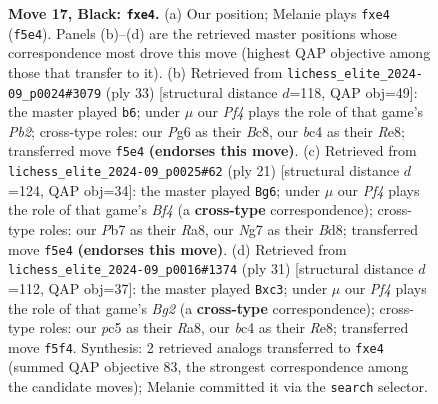 \documentclass[11pt]{article}
\begin{document}
\begin{figure}[p]
\caption{\textbf{Move 17, Black: \texttt{fxe4}.} (a) Our position; Melanie plays \texttt{fxe4} (\texttt{f5e4}). Panels (b)--(d) are the retrieved master positions whose correspondence most drove this move (highest QAP objective among those that transfer to it). (b) Retrieved from \texttt{lichess\_elite\_2024-09\_p0024\#3079} (ply 33) [structural distance $d$=118, QAP obj=49]: the master played \texttt{b6}; under $\mu$ our \emph{Pf4} plays the role of that game's \emph{Pb2}; cross-type roles: our \emph{P}g6 as their \emph{B}c8, our \emph{b}c4 as their \emph{R}e8; transferred move \texttt{f5e4} \textbf{(endorses this move)}. (c) Retrieved from \texttt{lichess\_elite\_2024-09\_p0025\#62} (ply 21) [structural distance $d$=124, QAP obj=34]: the master played \texttt{Bg6}; under $\mu$ our \emph{Pf4} plays the role of that game's \emph{Bf4} (a \textbf{cross-type} correspondence); cross-type roles: our \emph{P}b7 as their \emph{R}a8, our \emph{N}g7 as their \emph{B}d8; transferred move \texttt{f5e4} \textbf{(endorses this move)}. (d) Retrieved from \texttt{lichess\_elite\_2024-09\_p0016\#1374} (ply 31) [structural distance $d$=112, QAP obj=37]: the master played \texttt{Bxc3}; under $\mu$ our \emph{Pf4} plays the role of that game's \emph{Bg2} (a \textbf{cross-type} correspondence); cross-type roles: our \emph{p}c5 as their \emph{R}a8, our \emph{b}c4 as their \emph{R}e8; transferred move \texttt{f5f4}. Synthesis: 2 retrieved analogs transferred to \texttt{fxe4} (summed QAP objective 83, the strongest correspondence among the candidate moves); Melanie committed it via the \texttt{search} selector.}
\label{fig:thought-m33}
\end{figure}

\clearpage
\end{document}

